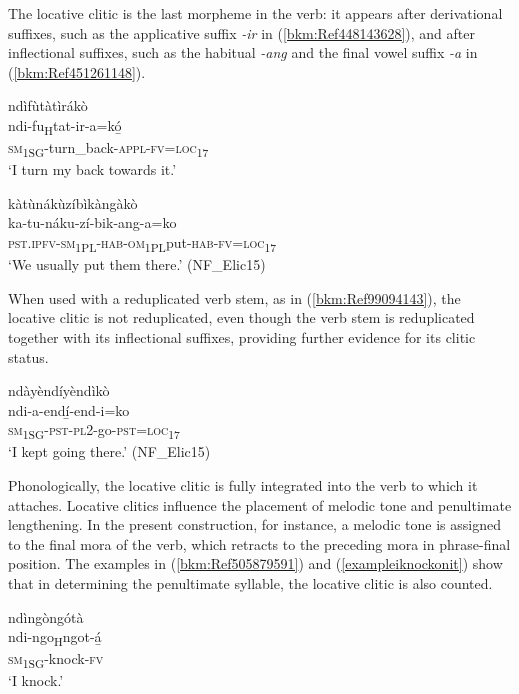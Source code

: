 The locative clitic is the last morpheme in the verb: it appears after derivational suffixes, such as the applicative suffix \textit{-ir} in (\ref{bkm:Ref448143628}), and after inflectional suffixes, such as the habitual \textit{-ang} and the final vowel suffix \textit{-a} in (\ref{bkm:Ref451261148}).

\ea
\label{bkm:Ref448143628}
\glll ndìfùtàtìrákò\\
ndi-fu\textsubscript{H}tat-ir-a=kó̲\\
\textsc{sm}\textsubscript{1SG}-turn\_back-\textsc{appl}-\textsc{fv}=\textsc{loc}\textsubscript{17}\\
\glt ‘I turn my back towards it.’
\z

\ea
\label{bkm:Ref451261148}
\glll kàtùnákùzíbìkàngàkò\\
ka-tu-náku-zí-bik-ang-a=ko\\
\textsc{pst}.\textsc{ipfv}-\textsc{sm}\textsubscript{1PL}-\textsc{hab}-\textsc{om}\textsubscript{1PL}put-\textsc{hab}-\textsc{fv}=\textsc{loc}\textsubscript{17}\\
\glt ‘We usually put them there.’ (NF\_Elic15)
\z

When used with a reduplicated verb stem, as in (\ref{bkm:Ref99094143}), the locative clitic is not reduplicated, even though the verb stem is reduplicated together with its inflectional suffixes, providing further evidence for its clitic status.

\ea
\label{bkm:Ref99094143}
\glll ndàyèndíyèndìkò\\
ndi-a-endí̲-end-i=ko\\
\textsc{sm}\textsubscript{1SG}-\textsc{pst}-\textsc{pl}2-go-\textsc{pst}=\textsc{loc}\textsubscript{17}\\
\glt ‘I kept going there.’ (NF\_Elic15)
\z

Phonologically, the locative clitic is fully integrated into the verb to which it attaches. Locative clitics influence the placement of melodic tone and penultimate lengthening. In the present construction, for instance, a melodic tone is assigned to the final mora of the verb, which retracts to the preceding mora in phrase-final position. The examples in (\ref{bkm:Ref505879591}) and (\ref{exampleiknockonit}) show that in determining the penultimate syllable, the locative clitic is also counted.

\ea
\label{bkm:Ref505879591}
\glll ndìngòngótà\\
ndi-ngo\textsubscript{H}ngot-á̲\\
\textsc{sm}\textsubscript{1SG}-knock-\textsc{fv}\\
\glt ‘I knock.’
\z

